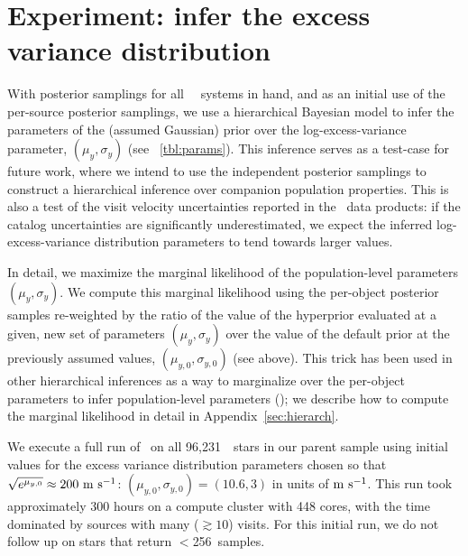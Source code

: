 \documentclass[modern, letterpaper]{aastex62}
\newcommand{\apogee}{\project{\acronym{APOGEE}}}
\newcommand{\thejoker}{\project{The~Joker}}
\newcommand{\DR}{\acronym{DR14}}
\newcommand{\nposterior}{256}
\newcommand{\nstars}{96,231}
\begin{document}
%


\section{Experiment: infer the excess variance distribution}
\label{sec:inferjitter}

With posterior samplings for all \apogee\ \DR\ systems in hand, and as an
initial use of the per-source posterior samplings, we use a hierarchical
Bayesian model to infer the parameters of the (assumed Gaussian) prior over the
log-excess-variance parameter, $(\mu_y, \sigma_y)$ (see
\tablename~\ref{tbl:params}).
This inference serves as a test-case for future work, where we intend to use the
independent posterior samplings to construct a hierarchical inference over
companion population properties.
This is also a test of the visit velocity uncertainties reported in the \apogee\
data products: if the catalog uncertainties are significantly underestimated, we
expect the inferred log-excess-variance distribution parameters to tend towards
larger values.

In detail, we maximize the marginal likelihood of the population-level
parameters $(\mu_y, \sigma_y)$.
We compute this marginal likelihood using the per-object posterior samples
re-weighted by the ratio of the value of the hyperprior evaluated at a given,
new set of parameters $(\mu_y, \sigma_y)$ over the value of the default prior at
the previously assumed values, $(\mu_{y,0}, \sigma_{y,0})$ (see above).
This trick has been used in other hierarchical inferences as a way to
marginalize over the per-object parameters to infer population-level parameters
(\citealt{Hogg:2010,Foreman-Mackey:2014}); we describe how to compute the
marginal likelihood in detail in Appendix~\ref{sec:hierarch}.

We execute a full run of \thejoker\ on all \nstars\ \apogee\ stars in our parent
sample using initial values for the excess variance distribution parameters
chosen so that $\sqrt{e^{\mu_{y,0}}} \approx 200~\mathrm{m}~\mathrm{s}^{-1}$: $(\mu_{y,0},
\sigma_{y,0}) = (10.6, 3)$ in units of $\mathrm{m}~\mathrm{s}^{-1}$.
This run took approximately 300 hours on a compute cluster with 448 cores, with
the time dominated by sources with many ($\gtrsim 10$) visits.  For this initial
run, we do not follow up on stars that return $<$\nposterior\ samples.
\end{document}
